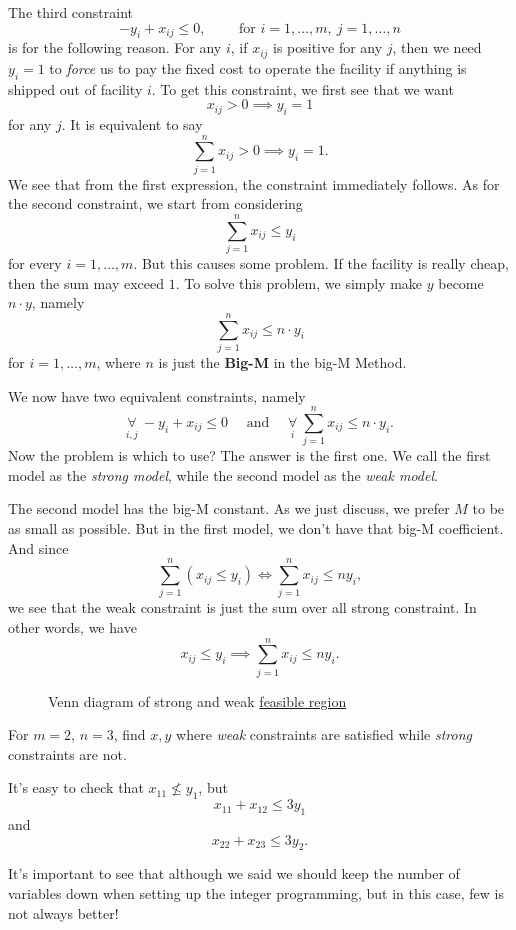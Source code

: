 \begin{note}
	The third constraint
	\[
		-y_{i} + x_{ij}\leq 0,\qquad \text{ for }i = 1, \ldots , m,\ j = 1, \ldots , n
	\]
	is for the following reason. For any \(i\), if \(x_{ij}\) is positive for any \(j\), then we need \(y_{i} = 1\) to \emph{force} us to pay the fixed cost
	to operate the facility if anything is shipped out of facility \(i\). To get this constraint, we first see that we want
	\[
		x_{ij}>0 \implies y_{i} = 1
	\]
	for any \(j\). It is equivalent to say
	\[
		\sum\limits_{j=1}^{n} x_{ij}>0 \implies y_{i} = 1.
	\]
	We see that from the first expression, the constraint immediately follows. As for the second constraint, we start from considering
	\[
		\sum\limits_{j=1}^{n} x_{ij}\leq y_{i}
	\]
	for every \(i = 1, \ldots , m\). But this causes some problem. If the facility is really cheap, then the sum may exceed \(1\).
	To solve this problem, we simply make \(y\) become \(n\cdot y\), namely
	\[
		\sum\limits_{j=1}^{n} x_{ij}\leq n\cdot y_{i}
	\]
	for \(i = 1, \ldots, m\), where \(n\) is just the \textbf{Big-M} in the big-M Method.
\end{note}

We now have two equivalent constraints, namely
\[
	\underset{i, j}{\forall }\ -y_{i} + x_{ij}\leq 0\quad  \text{ and }\quad \underset{i}{\forall }\ \sum\limits_{j=1}^{n} x_{ij}\leq n\cdot y_{i}.
\]
Now the problem is which to use? The answer is the first one. We call the first model as the \emph{strong model}, while the second model as
the \emph{weak model}.

\begin{intuition}
	The second model has the big-M constant. As we just discuss, we prefer \(M\) to be as small as possible. But in the first model, we don't have that
	big-M coefficient. And since
	\[
		\sum\limits_{j=1}^{n} \left(x_{ij}\leq y_i\right) \iff \sum\limits_{j=1}^{n} x_{ij}\leq n y_{i},
	\]
	we see that the weak constraint is just the sum over all strong constraint. In other words, we have
	\[
		x_{ij}\leq y_i \implies \sum\limits_{j=1}^{n} x_{ij}\leq n y_{i}.
	\]
	\begin{figure}[H]
		\centering
		\caption{Venn diagram of strong and weak \hyperref[def:feasible-region]{feasible region}}
		\label{fig:strong-weak-constraint}
	\end{figure}

	\begin{eg}
		For \(m = 2\), \(n = 3\), find \(x, y\) where \emph{weak} constraints are satisfied while \emph{strong} constraints are not.
		\begin{figure}[H]
			\centering
			\label{fig:integer-programming-eg2}
		\end{figure}
		It's easy to check that \(x_{11}\nleq y_1\), but
		\[
			x_{11}+x_{12} \leq 3y_1
		\]
		and
		\[
			x_{22}+x_{23}\leq 3y_2.
		\]
	\end{eg}
\end{intuition}
\begin{remark}
	It's important to see that although we said we should keep the number of variables down when setting up the integer programming, but in this case,
	few is not always better!
\end{remark}

